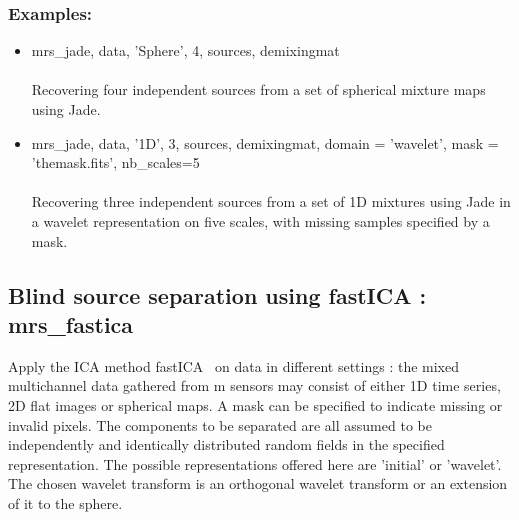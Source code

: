\subsubsection*{Examples:} 
\begin{itemize}
\item mrs\_jade, data, 'Sphere', 4, sources, demixingmat\\\\
Recovering four independent sources from a set of spherical mixture maps using Jade.  

\item   mrs\_jade, data, '1D', 3, sources, demixingmat, domain = 'wavelet', mask = 'themask.fits', nb\_scales=5\\\\
Recovering three independent sources from a set of 1D mixtures using Jade in a wavelet representation on five scales, with missing samples specified by a mask.  

\end{itemize}



\subsection{Blind source separation using fastICA : mrs\_fastica}
Apply the ICA method fastICA~\cite{ica:icabook} on data in different settings : the mixed multichannel data gathered 
from m sensors may consist of either 1D time series, 2D flat images or spherical maps. A mask can be specified to 
indicate missing or invalid pixels. The components to be separated are all assumed to be independently and identically 
distributed random fields in the specified representation. The possible representations offered here are 'initial' 
or 'wavelet'. The chosen wavelet transform is an orthogonal wavelet transform or an extension of it to the sphere.

